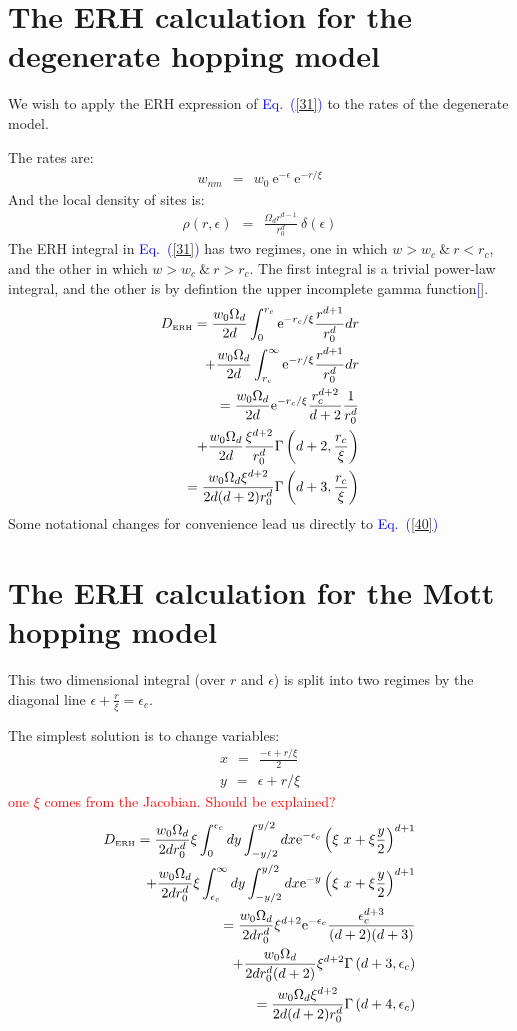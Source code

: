 \documentclass[aps,prb,floats,floatfix,twocolumn]{revtex4}
\newcommand{\eexp}{\mbox{e}^}
\newcommand{\tbox}[1]{\mbox{\tiny #1}}
\newcommand{\beq}{\begin{eqnarray}}
\newcommand{\eeq}{\end{eqnarray}}
\newcommand{\Eq}[1]{\textcolor{blue}{Eq.\!\!~(\ref{#1})}}
\newcommand{\rmrk}[1]{\textcolor{red}{#1}}
\renewcommand{\cite}[1]{\textcolor{blue}{[\onlinecite{#1}}]} %
\begin{document}
\appendix
\section{The ERH calculation for the degenerate hopping model}

We wish to apply the ERH expression of \Eq{31} 
to the rates of the degenerate model.

The rates are:
%
\beq
w_{nm} \ \ = \ \  w_0 \ \eexp{-\epsilon} \ \eexp{-r/\xi} 
\eeq
%
And the local density of sites is:
%
\beq
\rho(r,\epsilon) \ \ =\ \ \frac{\Omega_d r^{d-1}}{r_0^d} \ \delta (\epsilon)
\eeq
%
The ERH integral in \Eq{31} has two regimes, 
one in which $w>w_c \ \& \ r<r_c$, and the other in which $w>w_c\ \& \ r>r_c$.
The first integral is a trivial power-law integral, 
and the other is by defintion the upper incomplete gamma function\cite{dlmf_gamma}.
%
\beq
D_{\tbox{ERH}} = \frac{w_0\Omega_d}{2d}\int_0^{r_c} \eexp{-r_c / \xi} \frac{r^{d+1}}{r_0^d} dr \\
               + \frac{w_0\Omega_d}{2d}\int_{r_c}^\infty \eexp{-r / \xi} \frac{r^{d+1}}{r_0^d} dr \\
\ \ \ = \frac{w_0\Omega_d}{2d} \eexp{-r_c / \xi} \frac{r_c^{d+2}}{d+2} \frac{1}{r_0^d} \\
\ \ \  +\frac{w_0\Omega_d}{2d} \frac{\xi^{d+2}}{r_0^d} \Gamma\left(d+2,\frac{r_c}{\xi}\right)\\
\ \ \ = \frac{w_0\Omega_d \xi^{d+2}}{2d(d+2)r_0^d}\Gamma\left(d+3,\frac{r_c}{\xi}\right)
\eeq
%
Some notational changes for convenience lead us directly to \Eq{40} 


\section{The ERH calculation for the Mott hopping model}

This two dimensional integral (over $r$ and $\epsilon$) 
is split into two regimes by the diagonal line $\epsilon+\frac{r}{\xi} = \epsilon_c$.

The simplest solution is to change variables:
%
\beq
x\ \  =\ \  \frac{-\epsilon+r/\xi}{2} \\
y\ \ =\ \ \epsilon+r/\xi
\eeq
%
\rmrk{one $\xi$ comes from the Jacobian. Should be explained?}
\beq
D_{\tbox{ERH}} = \frac{w_0\Omega_d}{2dr_0^d}\xi\int_0^{\epsilon_c}dy\int_{-y/2}^{y/2}dx \eexp{-\epsilon_c} \left(\xi\ x+\xi \frac{y}{2}\right)^{d+1} \\
+ \frac{w_0\Omega_d}{2dr_0^d}\xi\int_{\epsilon_c}^\infty dy\int_{-y/2}^{y/2}dx \eexp{-y} \left(\xi\ x+\xi \frac{y}{2}\right)^{d+1} \\
\ \ \ = \frac{w_0\Omega_d}{2dr_0^d}\xi^{d+2} \eexp{-\epsilon_c} \frac{\epsilon_c^{d+3}}{(d+2)(d+3)}  \\
\ \ \  +\frac{w_0\Omega_d}{2dr_0^d(d+2)}\xi^{d+2} \Gamma\left(d+3,\epsilon_c\right)\\
\ \ \ = \frac{w_0\Omega_d \xi^{d+2}}{2d(d+2)r_0^d}\Gamma\left(d+4,\epsilon_c\right)
\eeq
%
\end{document}
